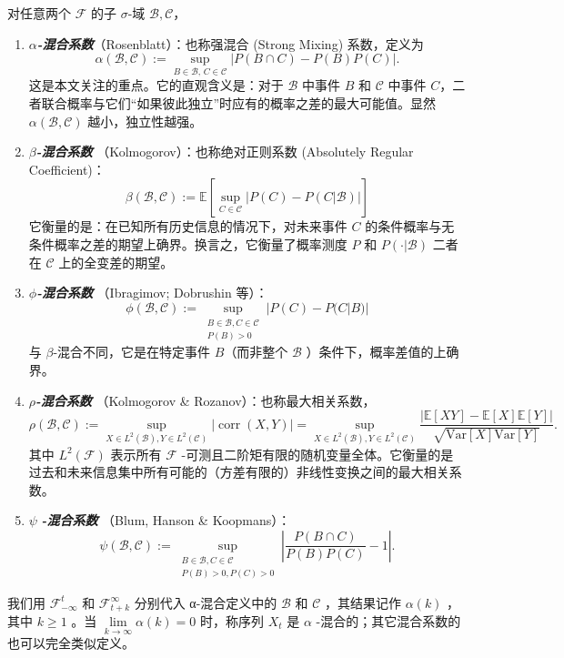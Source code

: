\begin{definition*}[混合系数]
对任意两个 $\mathcal F$ 的子 $\sigma$-域 $\mathcal B,\mathcal C$，

\begin{enumerate}
\def\labelenumi{\arabic{enumi}.}
\tightlist
\item
  $\alpha$\textbf{\emph{-混合系数}}（Rosenblatt）：也称强混合 (Strong Mixing) 系数，定义为
  \[
  \alpha(\mathcal B,\mathcal C)
  :=\sup_{B\in\mathcal B,\,C\in\mathcal C}
  |P(B\cap C)-P(B)P(C)|.
  \]
  这是本文关注的重点。它的直观含义是：对于 $\mathcal{B}$ 中事件 $B$ 和 $\mathcal{C}$ 中事件 $C$，二者联合概率与它们``如果彼此独立''时应有的概率之差的最大可能值。显然 $\alpha(\mathcal{B},\mathcal{C})$ 越小，独立性越强。
\item
  \textbf{$\beta$\emph{-混合系数 }}（Kolmogorov）：也称绝对正则系数 (Absolutely Regular Coefficient)： \[ \beta(\mathcal{B},\mathcal{C}) := \mathbb{E}\left[ \sup_{C\in \mathcal{C}}\Big|P(C) - P(C|\mathcal{B})\Big| \right] \]它衡量的是：在已知所有历史信息的情况下，对未来事件 $C$ 的条件概率与无条件概率之差的期望上确界。换言之，它衡量了概率测度 $P$ 和 $P(\cdot|\mathcal B)$ 二者在 $\mathcal{C}$ 上的全变差的期望。
\item
  \textbf{$\phi$\emph{-混合系数 }}（Ibragimov; Dobrushin 等）：\[ \phi (\mathcal{B},\mathcal{C}) := \sup_{\substack{B\in \mathcal{B},C\in \mathcal{C}\\ P(B)>0}}|P(C) - P(C|B)| \]与 $\beta$-混合不同，它是在特定事件 $B$（而非整个 $\mathcal{B}$ ）条件下，概率差值的上确界。
\item
  \textbf{$\rho$\emph{-混合系数 }}（Kolmogorov \& Rozanov）：也称最大相关系数，
  \[  \rho(\mathcal{B},\mathcal{C}) := \sup_{X \in L^2(\mathcal{B}), Y \in L^2(\mathcal{C})} \Big|\operatorname{corr}(X, Y)\Big|= \sup_{X \in L^2(\mathcal{B}), Y \in L^2(\mathcal{C})}\frac{|\mathbb{E}[XY]-\mathbb{E}[X]\mathbb{E}[Y]|}{\sqrt{\mathrm{Var}[X]\mathrm{Var}[Y]}}.
  \]  其中 $L^2(\mathcal{F})$ 表示所有 $\mathcal{F}$ -可测且二阶矩有限的随机变量全体。它衡量的是过去和未来信息集中所有可能的（方差有限的）非线性变换之间的最大相关系数。
\item
  $\psi$ \textbf{\emph{-混合系数 }}（Blum, Hanson \& Koopmans）：
  \[
  \psi(\mathcal{B},\mathcal{C}):= \sup_{\substack{B\in \mathcal{B},C\in \mathcal{C}\\ P(B)>0,P(C)>0}}\left|\frac{P(B\cap C)}{P(B)P(C)}-1\right|.
  \]
\end{enumerate}

我们用 $\mathcal F_{-\infty}^t$ 和 $\mathcal F_{t+k}^\infty$ 分别代入 α-混合定义中的 $\mathcal B$ 和 $\mathcal C$ ，其结果记作 $\alpha(k)$ ，其中 $k\ge 1$ 。当 $\lim\limits_{k\to\infty}\alpha(k)=0$ 时，称序列 $X_t$ 是 $\alpha$ -混合的；其它混合系数的也可以完全类似定义。
\end{definition*}

